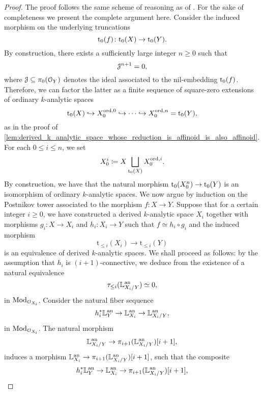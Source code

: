 \documentclass[10pt,a4paper,reqno]{amsart} %
\theoremstyle{plain}
\theoremstyle{definition}
\theoremstyle{remark}
\numberwithin{equation}{section}
\begin{document}
\begin{proof}
    The proof follows the same scheme of reasoning as of \cite[Proposition 5.5.3]{Gaitsgory_Study_II}. For the sake of completeness we present the complete argument here.
    Consider the induced morphism on the underlying truncations
        \[
            \mathrm{t}_0(f) \colon \mathrm{t}_0(X) \to \mathrm{t}_0(Y).   
        \]
    By construction, there exists a sufficiently large integer $n \ge 0$ such that
        \[
            \mathcal J^{n+1} = 0,  
        \]
    where $\mathcal J \subseteq \pi_0(\mathcal O_Y)$ denotes the ideal associated to the nil-embedding $\mathrm{t}_0(f)$.
    Therefore, we can factor the latter as a finite sequence of square-zero extensions of ordinary $k$-analytic spaces
        \[
            \mathrm{t}_0(X) \hookrightarrow X_0^{\mathrm{ord}, 0} \hookrightarrow \dots \hookrightarrow X^{\mathrm{ord}, n}_0 = \mathrm{t}_0(Y),
        \]
    as in the proof of \cref{lem:derived_k_analytic_space_whose_reduction_is_affinoid_is_also_affinoid}. For each $0 \le i \le n$, we set
        \[
            X_0^i \coloneqq X \bigsqcup_{\mathrm{t}_0(X)} X_0^{\mathrm{ord}, i}.
        \]
    By construction, we have that the natural morphism $\mathrm{t}_0(X_0^n) \to \mathrm{t}_0(Y)$ is an isomorphism of ordinary $k$-analytic spaces.
    We now argue by induction on the Postnikov tower associated to the morphism $f \colon X \to Y$.
    Suppose that for a certain integer $i \ge 0$, we have constructed a derived $k$-analytic space $X_i$ together with morphisms $g_i \colon
    X \to X_i$ and $h_i \colon X_i \to Y$ such that $f \simeq h_i \circ g_i$
    and the induced morphism
        \[
            \mathrm{t}_{\le i}(X_i) \to \mathrm{t}_{\le i}(Y)
        \]
    is an equivalence of derived $k$-analytic spaces. We shall proceed as follows: by the assumption that $h_i$ is $(i+1)$-connective, we deduce from
    \cite[Proposition 5.34]{Porta_Yu_Representability} the existence of a natural equivalence
        \[
            \tau_{\le i}(\mathbb L_{X_i/Y}^\mathrm{an}) \simeq 0,
        \]
    in $\mathrm{Mod}_{\mathcal O_{X_i}}$. Consider the natural fiber sequence
        \[
            h_i^* \mathbb L^\mathrm{an}_{Y} \to \mathbb L^\mathrm{an}_{X_i} \to \mathbb L^\mathrm{an}_{X_i/Y},
        \]
    in $\mathrm{Mod}_{\mathcal O_{X_i}}$. The natural morphism
        \[
            \mathbb L^\mathrm{an}_{X_i/ Y} \to \pi_{i+1}(\mathbb L^\mathrm{an}_{X_i/Y})[i+1],  
        \]
    induces a morphism $\mathbb L^\mathrm{an}_{X_i} \to \pi_{i+1}(\mathbb L^\mathrm{an}_{X_i/Y})[i+1]$, such that the composite
        \begin{equation} \label{eq:fiber_sequence_of_cotangent_complexes_to_produce_the_existence_of_the_desired_square_zero_extension_approximating_Y_in_degree_i+1}
            h_i^* \bbL\an_{Y} \to \bbL\an_{X_i} \to \pi_{i+1}(\bbL\an_{X_i/Y})[i+1],  

\end{equation}
\end{proof}
\end{document}
